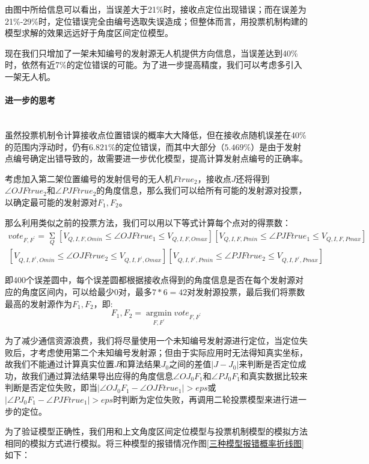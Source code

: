 \documentclass{ctexart}
\newcommand{\subsubsubsection}[1]{\paragraph{#1}\mbox{}\\}
\begin{document}
  由图中所给信息可以看出，当误差大于21\%时，接收点定位出现错误；而在误差为21\%-29\%时，定位错误完全由编号选取失误造成；但整体而言，用投票机制构建的模型求解的效果远远好于角度区间定位模型。

  现在我们只增加了一架未知编号的发射源无人机提供方向信息，当误差达到40\%时，依然有近7\%的定位错误的可能。为了进一步提高精度，我们可以考虑多引入一架无人机。

  \subsubsubsection{进一步的思考}

  虽然投票机制令计算接收点位置错误的概率大大降低，但在接收点随机误差在40\%的范围内浮动时，仍有$6.821\%$的定位错误，而其中大部分（$5.469\%$）是由于发射点编号确定出错导致的，故需要进一步优化模型，提高计算发射点编号的正确率。

  考虑加入第二架位置编号的发射信号的无人机$Ftrue_2$，接收点$J$还将得到$\angle OJFtrue_2$和$\angle PJFtrue_2$的角度信息，那么我们可以给所有可能的发射源对投票，以确定最可能的发射源对$F_1,F_2$。

  那么利用类似之前的投票方法，我们可以用以下等式计算每个点对的得票数：
\begin{equation}
\begin{split}
    vote_{F,F^{'}}=\mathop{\Sigma}\limits_{Q} [V_{Q,I,F,Omin} \le \angle OJFtrue_1 \le V_{Q,I,F,Omax}][V_{Q,I,F,Pmin} \le \angle PJFtrue_1 \le V_{Q,I,F,Pmax}]\\
    [V_{Q,I,F^{'},Omin} \le \angle OJFtrue_2 \le V_{Q,I,F^{'},Omax}][V_{Q,I,F^{'},Pmin} \le \angle PJFtrue_2 \le V_{Q,I,F^{'},Pmax}]
\end{split}
\end{equation}

即400个误差圆中，每个误差圆都根据接收点得到的角度信息是否在每个发射源对应的角度区间内，可以给最少$0$对，最多$7*6=42$对发射源投票，最后我们将票数最高的发射源作为$F_1,F_2$，即:
\begin{equation}
 F_1,F_2=\mathop{\arg\min}\limits_{F,F^{'}} vote_{F,F^{'}}
\end{equation}

为了减少通信资源浪费，我们将尽量使用一个未知编号发射源进行定位，当定位失败后，才考虑使用第二个未知编号发射源；但由于实际应用时无法得知真实坐标，故我们不能通过计算真实位置$J$和算法结果$J_0$之间的差值$|J-J_0|$来判断是否定位成功，故我们通过算法结果导出应得的角度信息$\angle OJ_0F_1$和$\angle PJ_0F_1$和真实数据比较来判断是否定位失败，即当$|\angle OJ_0F_1 - \angle OJFtrue_1| > eps$或$|\angle PJ_0F_1 - \angle PJFtrue_1| > eps$时判断为定位失败，再调用二轮投票模型来进行进一步的定位。

为了验证模型正确性，我们用和上文角度区间定位模型与投票机制模型的模拟方法相同的模拟方式进行模拟。将三种模型的报错情况作图\ref{三种模型报错概率折线图}如下：
\end{document}
